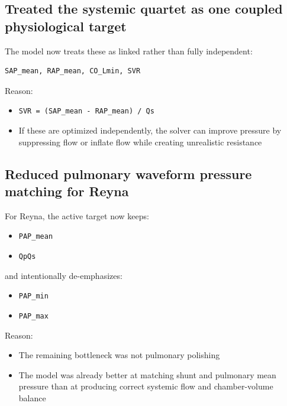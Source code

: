 \documentclass[11pt,a4paper]{article}
\begin{document}
\subsection{Treated the systemic quartet as one coupled physiological target}

The model now treats these as linked rather than fully independent:

\begin{verbatim}
SAP_mean, RAP_mean, CO_Lmin, SVR
\end{verbatim}

Reason:

\begin{itemize}[leftmargin=1.5em]
    \item \texttt{SVR = (SAP\_mean - RAP\_mean) / Qs}
    \item If these are optimized independently, the solver can improve pressure
    by suppressing flow or inflate flow while creating unrealistic resistance
\end{itemize}

\subsection{Reduced pulmonary waveform pressure matching for Reyna}

For Reyna, the active target now keeps:

\begin{itemize}[leftmargin=1.5em]
    \item \texttt{PAP\_mean}
    \item \texttt{QpQs}
\end{itemize}

and intentionally de-emphasizes:

\begin{itemize}[leftmargin=1.5em]
    \item \texttt{PAP\_min}
    \item \texttt{PAP\_max}
\end{itemize}

Reason:

\begin{itemize}[leftmargin=1.5em]
    \item The remaining bottleneck was not pulmonary polishing
    \item The model was already better at matching shunt and pulmonary mean
    pressure than at producing correct systemic flow and chamber-volume balance
\end{itemize}
\end{document}
